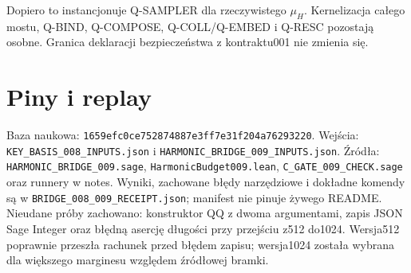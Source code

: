 \documentclass[11pt,a4paper]{article}
\newcommand{\code}[1]{\nolinkurl{#1}}
\begin{document}
Dopiero to instancjonuje Q-SAMPLER dla rzeczywistego $\mu_H$.
Kernelizacja całego mostu, Q-BIND, Q-COMPOSE, Q-COLL/Q-EMBED i Q-RESC
pozostają osobne. Granica deklaracji bezpieczeństwa z kontraktu001 nie zmienia się.

\appendix\section{Piny i replay}
Baza naukowa: \code{1659efc0ce752874887e3ff7e31f204a76293220}.
Wejścia: \code{KEY_BASIS_008_INPUTS.json} i \code{HARMONIC_BRIDGE_009_INPUTS.json}.
Źródła: \code{HARMONIC_BRIDGE_009.sage}, \code{HarmonicBudget009.lean},
\code{C_GATE_009_CHECK.sage} oraz runnery w notes.
Wyniki, zachowane błędy narzędziowe i dokładne komendy są w
\code{BRIDGE_008_009_RECEIPT.json}; manifest nie pinuje żywego README.
Nieudane próby zachowano: konstruktor QQ z dwoma argumentami, zapis JSON
Sage Integer oraz błędną asercję długości przy przejściu z512 do1024.
Wersja512 poprawnie przeszła rachunek przed błędem zapisu; wersja1024
została wybrana dla większego marginesu względem źródłowej bramki.
\end{document}
